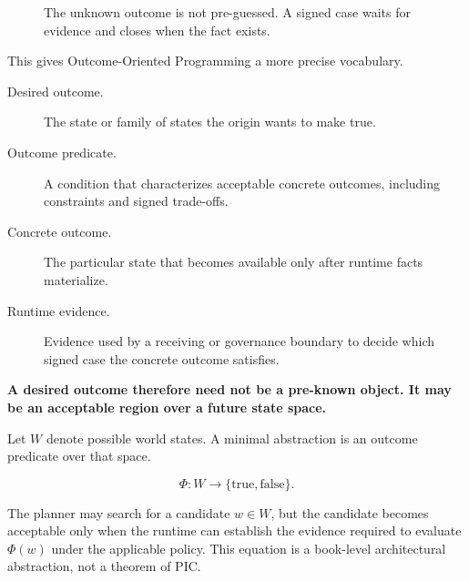 \documentclass[10pt,oneside,openany]{book}
\begin{document}
\begin{figure}[ht]
\centering
{}
\caption{The unknown outcome is not pre-guessed. A signed case waits for evidence and closes when the fact exists.}
\end{figure}

This gives Outcome-Oriented Programming a more precise vocabulary.

\begin{description}
\item[Desired outcome.] The state or family of states the origin wants to make true.
\item[Outcome predicate.] A condition that characterizes acceptable concrete outcomes, including constraints and signed trade-offs.
\item[Concrete outcome.] The particular state that becomes available only after runtime facts materialize.
\item[Runtime evidence.] Evidence used by a receiving or governance boundary to decide which signed case the concrete outcome satisfies.
\end{description}

\textbf{A desired outcome therefore need not be a pre-known object. It may be an acceptable region over a future state space.}

Let $W$ denote possible world states. A minimal abstraction is an outcome predicate over that space.
\begin{formulabox}
\[
\Phi : W \rightarrow \{\mathrm{true},\mathrm{false}\}.
\]
\end{formulabox}
The planner may search for a candidate $w\in W$, but the candidate becomes acceptable only when the runtime can establish the evidence required to evaluate $\Phi(w)$ under the applicable policy. This equation is a book-level architectural abstraction, not a theorem of PIC.
\end{document}
